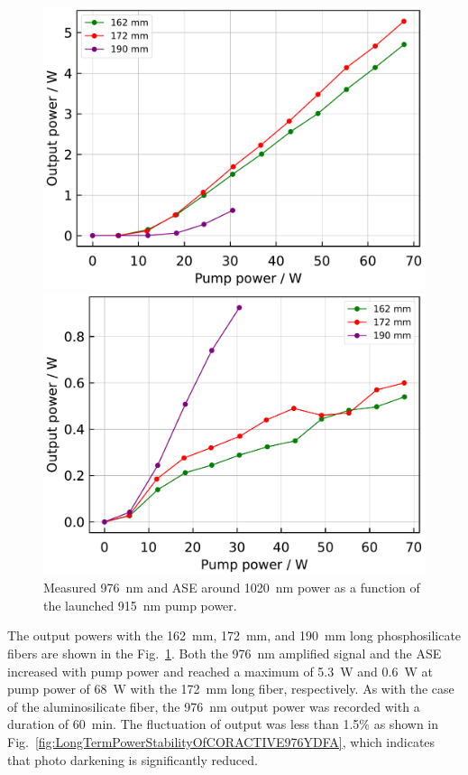 \documentclass{osa-article}
\begin{document}
\begin{figure}[h]
  \begin{minipage}[b]{0.5\linewidth}
    \centering
    \includegraphics[keepaspectratio, width=0.9\linewidth]{./Figure/DCF-YB-20-128P-FAC172mm_SignalComparisonByLength_915Pump976Seed0.24W_Exp}
    \subcaption{}
  \end{minipage}
  \begin{minipage}[b]{0.5\linewidth}
    \centering
    \includegraphics[keepaspectratio, width=0.9\linewidth]{./Figure/DCF-YB-20-128P-FAC172mm_ASEComparisonByLength_915Pump976Seed0.24W_Exp}
    \subcaption{}
  \end{minipage}
  \caption{Measured \SI{976}{\nm} and ASE around \SI{1020}{\nm} power as a function of the launched \SI{915}{\nm} pump power.}
  \label{fig:OutputComparisonOfCORACTIVE976YDFA}
\end{figure}
The output powers with the \SI{162}{\mm}, \SI{172}{\mm}, and \SI{190}{\mm} long phosphosilicate fibers are shown in the Fig.~\ref{fig:OutputComparisonOfCORACTIVE976YDFA}.
Both the \SI{976}{nm} amplified signal and the ASE increased with pump power and reached a maximum of \SI{5.3}{\W} and \SI{0.6}{\W} at pump power of \SI{68}{\W} with the \SI{172}{\mm} long fiber, respectively.
As with the case of the aluminosilicate fiber, the \SI{976}{\nm} output power was recorded with a duration of \SI{60}{\minute}.
The fluctuation of output was less than 1.5\% as shown in Fig.~\ref{fig:LongTermPowerStabilityOfCORACTIVE976YDFA}, which indicates that photo darkening is significantly reduced.
\end{document}
